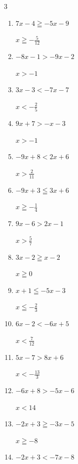 \begin{multicols}{3}
\begin{enumerate}
        $\displaystyle x<\frac{2}{3}$

  \item $7x-4\geqq -5x-9$

        $\displaystyle x\geqq -\frac{5}{12}$

  \item $-8x-1>-9x-2$

        $\displaystyle x>-1$

  \item $3x-3<-7x-7$

        $\displaystyle x<-\frac{2}{5}$

  \item $9x+7>-x-3$

        $\displaystyle x>-1$

  \item $-9x+8<2x+6$

        $\displaystyle x>\frac{2}{11}$

  \item $-9x+3\leqq 3x+6$

        $\displaystyle x\geqq -\frac{1}{4}$

  \item $9x-6>2x-1$

        $\displaystyle x>\frac{5}{7}$

  \item $3x-2\geqq x-2$

        $\displaystyle x\geqq 0$

  \item $x+1\leqq -5x-3$

        $\displaystyle x\leqq -\frac{2}{3}$

\columnbreak %

\resetques

  \item $6x-2<-6x+5$

        $\displaystyle x<\frac{7}{12}$

  \item $5x-7>8x+6$

        $\displaystyle x<-\frac{13}{3}$

  \item $-6x+8>-5x-6$

        $\displaystyle x<14$

  \item $-2x+3\geqq -3x-5$

        $\displaystyle x\geqq -8$

  \item $-2x+3<-7x-8$


\end{enumerate}
\end{multicols}
